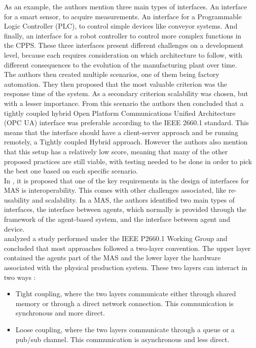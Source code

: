 As an example, the authors mention three main types of interfaces. An interface for a smart sensor, to acquire measurements. An interface for a Programmable Logic Controller (PLC), to control simple devices like conveyor systems. And finally, an interface for a robot controller to control more complex functions in the CPPS. These three interfaces present different challenges on a development level, because each requires consideration on which architecture to follow, with different consequences to the evolution of the manufacturing plant over time.\\

The authors then created multiple scenarios, one of them being factory automation. They then proposed that the most valuable criterion was the response time of the system. As a secondary criterion scalability was chosen, but with a lesser importance. From this scenario the authors then concluded that a tightly coupled hybrid Open Platform Communications Unified Architecture (OPC UA) interface was preferable according to the IEEE 2660.1 standard. This means that the interface should have a client-server approach and be running remotely, a Tightly coupled Hybrid approach. However the authors also mention that this setup has a relatively low score, meaning that many of the other proposed practices are still viable, with testing needed to be done in order to pick the best one based on each specific scenario.\\


In \cite{Karnouskos2019}, it is proposed that one of the key requirements in the design of interfaces for MAS is interoperability. This comes with other challenges associated, like re-usability and scalability. In a MAS, the authors identified two main types of interfaces, the interface between agents, which normally is provided through the framework of the agent-based system, and the interface between agent and device. \\


\citeauthor{8591641} \cite{8591641} analyzed a study performed under the IEEE P2660.1 Working Group \cite{9340089} and concluded that most approaches followed a two-layer convention. The upper layer contained the agents part of the MAS and the lower layer the hardware associated with the physical production system. These two layers can interact in two ways \cite{8591641}:
\begin{itemize}
	\item Tight coupling, where the two layers communicate either through shared memory or through a direct network connection. This communication is synchronous and more direct.
	\item Loose coupling, where the two layers communicate through a queue or a pub/sub channel. This communication is asynchronous and less direct.
\end{itemize}

